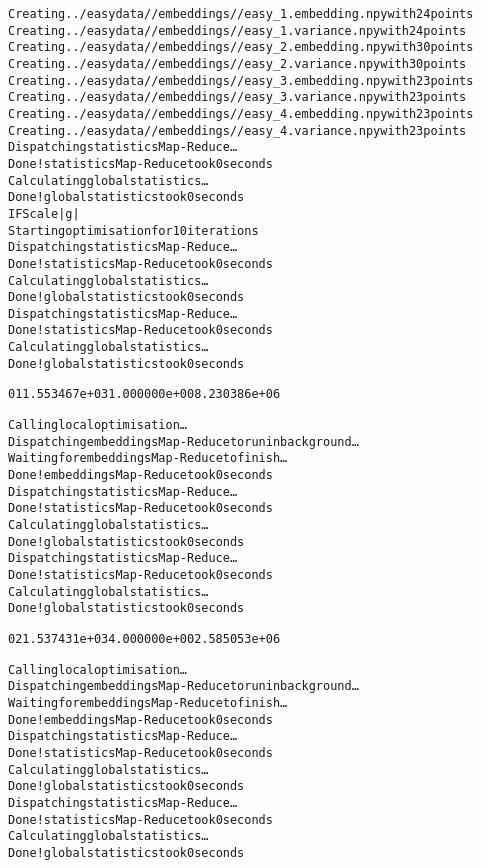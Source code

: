\documentclass[letterpaper,10pt,english]{/usr/share/sphinx/texinputs/sphinxhowto}
\newenvironment{InvisibleVerbatim}
        {\begin{mdframed}[leftmargin=0.1\linewidth,innerleftmargin=3pt,innerrightmargin=3pt, userdefinedwidth=1\linewidth, linewidth=0pt, linecolor=white, usetwoside=false]}
        {\end{mdframed}}
\begin{document}
    

        
        

            
                \begin{InvisibleVerbatim}
                \vspace{-0.5\baselineskip}
\begin{alltt}Creating ../easydata//embeddings//easy\_1.embedding.npy with 24 points
Creating ../easydata//embeddings//easy\_1.variance.npy with 24 points
Creating ../easydata//embeddings//easy\_2.embedding.npy with 30 points
Creating ../easydata//embeddings//easy\_2.variance.npy with 30 points
Creating ../easydata//embeddings//easy\_3.embedding.npy with 23 points
Creating ../easydata//embeddings//easy\_3.variance.npy with 23 points
Creating ../easydata//embeddings//easy\_4.embedding.npy with 23 points
Creating ../easydata//embeddings//easy\_4.variance.npy with 23 points
Dispatching statistics Map-Reduce\ldots
Done! statistics Map-Reduce took  0  seconds
Calculating global statistics\ldots
Done! global statistics took  0  seconds
 I    F              Scale          |g|
Starting optimisation for 10 iterations
Dispatching statistics Map-Reduce\ldots
Done! statistics Map-Reduce took  0  seconds
Calculating global statistics\ldots
Done! global statistics took  0  seconds
Dispatching statistics Map-Reduce\ldots
Done! statistics Map-Reduce took  0  seconds
Calculating global statistics\ldots
Done! global statistics took  0  seconds

 01   1.553467e+03   1.000000e+00   8.230386e+06

Calling local optimisation\ldots
Dispatching embeddings Map-Reduce to run in background\ldots
Waiting for embeddings Map-Reduce to finish\ldots
Done! embeddings Map-Reduce took  0  seconds
Dispatching statistics Map-Reduce\ldots
Done! statistics Map-Reduce took  0  seconds
Calculating global statistics\ldots
Done! global statistics took  0  seconds
Dispatching statistics Map-Reduce\ldots
Done! statistics Map-Reduce took  0  seconds
Calculating global statistics\ldots
Done! global statistics took  0  seconds

 02   1.537431e+03   4.000000e+00   2.585053e+06

Calling local optimisation\ldots
Dispatching embeddings Map-Reduce to run in background\ldots
Waiting for embeddings Map-Reduce to finish\ldots
Done! embeddings Map-Reduce took  0  seconds
Dispatching statistics Map-Reduce\ldots
Done! statistics Map-Reduce took  0  seconds
Calculating global statistics\ldots
Done! global statistics took  0  seconds
Dispatching statistics Map-Reduce\ldots
Done! statistics Map-Reduce took  0  seconds
Calculating global statistics\ldots
Done! global statistics took  0  seconds


\end{alltt}
\end{InvisibleVerbatim}
\end{document}
